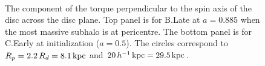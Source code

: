 \begin{figure}
	\centering
	\\
	\caption{The component of the torque perpendicular to the spin
          axis of the disc across the disc plane. Top
          panel is for B.Late at $a=0.885$ when the most massive
          subhalo is at pericentre.  The bottom panel is for C.Early
          at initialization ($a=0.5$). The circles correspond to $R_p
          = 2.2\,R_d=8.1\,\text{kpc}$ and
          $20\,h^{-1} \, \text{kpc}=29.5\,\text{kpc}$.}\label{fig:torque}
\end{figure}

